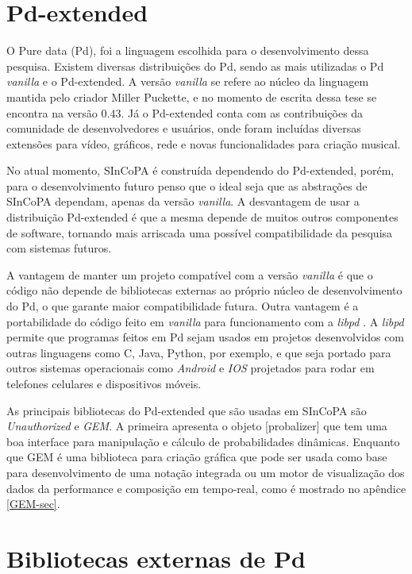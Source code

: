 \documentclass{ppgmus}
\begin{document}
\section{Pd-extended}

O Pure data (Pd), foi a linguagem escolhida para o desenvolvimento dessa pesquisa.
Existem diversas distribuições do Pd, sendo as mais utilizadas o Pd \textit{vanilla} e o Pd-extended.
A versão \textit{vanilla} se refere ao núcleo da linguagem mantida pelo criador Miller Puckette, e no
momento de escrita dessa tese se encontra na versão 0.43. Já o Pd-extended conta com as contribuições
da comunidade de desenvolvedores e usuários, onde foram incluídas diversas extensões para vídeo, gráficos, rede e
novas funcionalidades para criação musical.

No atual momento, SInCoPA é construída dependendo do Pd-extended, porém, para o desenvolvimento futuro penso
que o ideal seja que as abstrações de SInCoPA dependam, apenas da versão \textit{vanilla}. A desvantagem de usar a distribuição Pd-extended é 
que a mesma depende de muitos outros componentes de software, tornando mais arriscada uma possível 
compatibilidade da pesquisa com sistemas futuros.

A vantagem de manter um projeto compatível com a versão \textit{vanilla} é que
o código não depende de bibliotecas externas ao próprio núcleo de desenvolvimento
do Pd, o que garante maior compatibilidade futura. Outra vantagem é a portabilidade do código 
feito em \textit{vanilla} para funcionamento
com a \textit{libpd} \cite{libpd}. A \textit{libpd} permite que
programas feitos em Pd sejam usados em projetos desenvolvidos com outras linguagens como
C, Java, Python, por exemplo, e que seja portado para outros sistemas operacionais como
\textit{Android} e \textit{IOS} projetados para rodar em telefones celulares e dispositivos móveis.
 
As principais  bibliotecas do Pd-extended que são usadas em SInCoPA são \textit{Unauthorized} e 
\textit{GEM}. A primeira apresenta o objeto [probalizer] que tem uma boa interface para manipulação
e cálculo de probabilidades dinâmicas. Enquanto que GEM é uma biblioteca para criação gráfica
que pode ser usada como base para desenvolvimento de uma notação integrada ou um motor de
visualização dos dados da performance e composição em tempo-real, como é mostrado no apêndice \ref{GEM-sec}.

\section{Bibliotecas externas de Pd}
\end{document}
